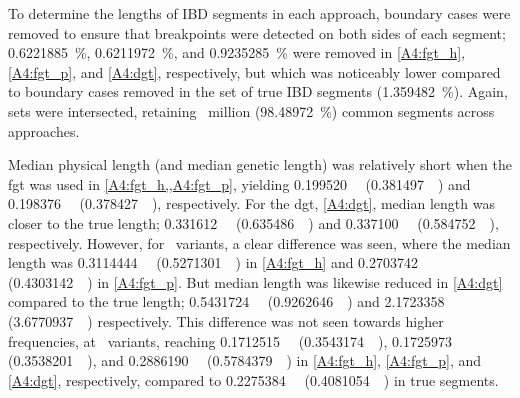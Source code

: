 To determine the lengths of IBD segments in each approach, boundary cases were removed to ensure that breakpoints were detected on both sides of each segment; \SI{0.6221885}{\percent}, \SI{0.6211972}{\percent}, and \SI{0.9235285}{\percent} were removed in \ref{A4:fgt_h}, \ref{A4:fgt_p}, and \ref{A4:dgt}, respectively, but which was noticeably lower compared to boundary cases removed in the set of true IBD segments (\SI{1.359482}{\percent}).
Again, sets were intersected, retaining ~million (\SI{98.48972}{\percent}) common segments across approaches.

%

%

Median physical length (and median genetic length) was relatively short when the \gls{fgt} was used in \cref{A4:fgt_h,,A4:fgt_p}, yielding \SI{0.199520}{\mega\basepair} (\SI{0.381497}{\centi\morgan}) and \SI{0.198376}{\mega\basepair} (\SI{0.378427}{\centi\morgan}), respectively.
For the \gls{dgt}, \cref{A4:dgt}, median length was closer to the true length; \SI{0.331612}{\mega\basepair} (\SI{0.635486}{\centi\morgan}) and \SI{0.337100}{\mega\basepair} (\SI{0.584752}{\centi\morgan}), respectively.
However, for ~variants, a clear difference was seen, where the median length was
\SI{0.3114444}{\mega\basepair} (\SI{0.5271301}{\centi\morgan}) in \ref{A4:fgt_h} and
\SI{0.2703742}{\mega\basepair} (\SI{0.4303142}{\centi\morgan}) in \ref{A4:fgt_p}.
But median length was likewise reduced in \ref{A4:dgt} compared to the true length; \SI{0.5431724}{\mega\basepair} (\SI{0.9262646}{\centi\morgan}) and
\SI{2.1723358}{\mega\basepair} (\SI{3.6770937}{\centi\morgan}) respectively.
This difference was not seen towards higher frequencies, \eg at ~variants, reaching
\SI{0.1712515}{\mega\basepair} (\SI{0.3543174}{\centi\morgan}),
\SI{0.1725973}{\mega\basepair} (\SI{0.3538201}{\centi\morgan}), and
\SI{0.2886190}{\mega\basepair} (\SI{0.5784379}{\centi\morgan}) in
\ref{A4:fgt_h}, \ref{A4:fgt_p}, and \ref{A4:dgt}, respectively, compared to
\SI{0.2275384}{\mega\basepair} (\SI{0.4081054}{\centi\morgan}) in true segments.

